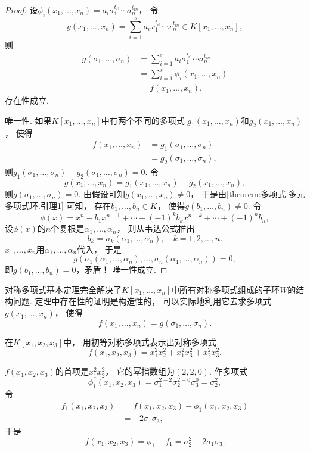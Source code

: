 \begin{theorem}[对称多项式基本定理]
\begin{proof}
设\(\phi_i(x_1,\dotsc,x_n)
=a_i \sigma_1^{t_{i1}} \dotsm \sigma_n^{t_{in}}\)，
令\[
	g(x_1,\dotsc,x_n)
	=\sum_{i=1}^s a_i x_1^{t_{i1}} \dotsm x_n^{t_{in}}
	\in K[x_1,\dotsc,x_n],
\]
则\begin{align*}
	g(\sigma_1,\dotsc,\sigma_n)
	&=\sum_{i=1}^s a_i \sigma_1^{t_{i1}} \dotsm \sigma_n^{t_{in}} \\
	&=\sum_{i=1}^s \phi_i(x_1,\dotsc,x_n) \\
	&=f(x_1,\dotsc,x_n).
\end{align*}
存在性成立.

唯一性.
如果\(K[x_1,\dotsc,x_n]\)中有两个不同的多项式
\(g_1(x_1,\dotsc,x_n)\)和\(g_2(x_1,\dotsc,x_n)\)，
使得\begin{align*}
	f(x_1,\dotsc,x_n)
	&=g_1(\sigma_1,\dotsc,\sigma_n) \\
	&=g_2(\sigma_1,\dotsc,\sigma_n),
\end{align*}
则\(g_1(\sigma_1,\dotsc,\sigma_n)-g_2(\sigma_1,\dotsc,\sigma_n)=0\).
令\[
	g(x_1,\dotsc,x_n)
	=g_1(x_1,\dotsc,x_n)-g_2(x_1,\dotsc,x_n),
\]
则\(g(\sigma_1,\dotsc,\sigma_n)=0\).
由假设可知\(g(x_1,\dotsc,x_n)\neq0\)，
于是由\cref{theorem:多项式.多元多项式环.引理1} 可知，
存在\(b_1,\dotsc,b_n \in K\)，
使得\(g(b_1,\dotsc,b_n)\neq0\).
令\[
	\phi(x)=x^n-b_1x^{n-1}+\dotsb+(-1)^kb_kx^{n-k}+\dotsb+(-1)^nb_n,
\]
设\(\phi(x)\)的\(n\)个复根是\(\alpha_1,\dotsc,\alpha_n\)，
则从韦达公式推出\[
	b_k=\sigma_k(\alpha_1,\dotsc,\alpha_n),
	\quad
	k=1,2,\dotsc,n.
\]
\(x_1,\dotsc,x_n\)用\(\alpha_1,\dotsc,\alpha_n\)代入，
于是\[
	g(\sigma_1(\alpha_1,\dotsc,\alpha_n),\dotsc,\sigma_n(\alpha_1,\dotsc,\alpha_n))=0,
\]
即\(g(b_1,\dotsc,b_n)=0\)，矛盾！
唯一性成立.
\end{proof}
\end{theorem}

对称多项式基本定理完全解决了\(K[x_1,\dotsc,x_n]\)中所有对称多项式组成的子环\(W\)的结构问题.
定理中存在性的证明是构造性的，
可以实际地利用它去求多项式\(g(x_1,\dotsc,x_n)\)，
使得\[
	f(x_1,\dotsc,x_n)
	=g(\sigma_1,\dotsc,\sigma_n).
\]

\begin{example}
在\(K[x_1,x_2,x_3]\)中，
用初等对称多项式表示出对称多项式\[
	f(x_1,x_2,x_3)
	=x_1^2 x_2^2
	+x_1^2 x_3^2
	+x_2^2 x_3^2.
\]
\begin{solution}
\(f(x_1,x_2,x_3)\)的首项是\(x_1^2 x_2^2\)，
它的幂指数组为\((2,2,0)\).
作多项式\[
	\phi_1(x_1,x_2,x_3)
	=\sigma_1^{2-2} \sigma_2^{2-0} \sigma_3^0
	=\sigma_2^2,
\]
令\begin{align*}
	f_1(x_1,x_2,x_3)
	&= f(x_1,x_2,x_3)
	- \phi_1(x_1,x_2,x_3) \\
	&= -2 \sigma_1 \sigma_3,
\end{align*}
于是\[
	f(x_1,x_2,x_3)
	=\phi_1+f_1
	=\sigma_2^2 - 2 \sigma_1 \sigma_3.
\]
\end{solution}
\end{example}

